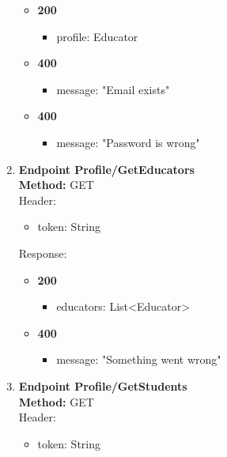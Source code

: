 \begin{enumerate}
\begin{itemize}
        \item \textbf{200} \\
        \begin{itemize}
            \item profile: Educator
        \end{itemize}
        \item \textbf{400} \\
        \begin{itemize}
            \item message: "Email exists"
        \end{itemize}
        \item \textbf{400} \\
        \begin{itemize}
            \item message: "Password is wrong"
        \end{itemize}
    \end{itemize}
    \item \textbf{Endpoint Profile/GetEducators} \\
    \textbf{Method:} GET \\
    Header:\\
    \begin{itemize}
        \item token: String
    \end{itemize}
    Response:\\
    \begin{itemize}
        \item \textbf{200} \\
        \begin{itemize}
            \item educators: List<Educator>
        \end{itemize}
        \item \textbf{400} \\
        \begin{itemize}
            \item message: "Something went wrong"
        \end{itemize}
    \end{itemize}
        \item \textbf{Endpoint Profile/GetStudents} \\
    \textbf{Method:} GET \\
    Header:\\
    \begin{itemize}
        \item token: String

\end{itemize}
\end{enumerate}
